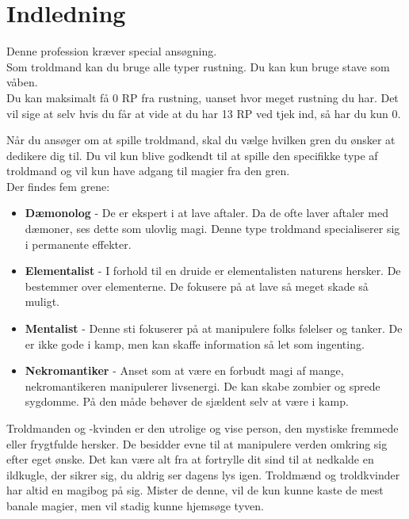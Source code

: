 \chapter{Indledning}

Denne profession kræver special ansøgning.\\
Som troldmand kan du bruge alle typer rustning. Du kan kun bruge stave som våben.\\
Du kan maksimalt få 0 RP fra rustning, uanset hvor meget rustning du har. Det vil sige at selv hvis du får at vide at du har 13 RP ved tjek ind, så har du kun 0.

Når du ansøger om at spille troldmand, skal du vælge hvilken gren du ønsker at dedikere dig til. Du vil kun blive godkendt til at spille den specifikke type af troldmand og vil kun have adgang til magier fra den gren.\\
Der findes fem grene:\\
\begin{itemize}
    \item \textbf{Dæmonolog} - De er ekspert i at lave aftaler. Da de ofte laver aftaler med dæmoner, ses dette som ulovlig magi. Denne type troldmand specialiserer sig i permanente effekter.
    \item \textbf{Elementalist} - I forhold til en druide er elementalisten naturens hersker. De bestemmer over elementerne. De fokusere på at lave så meget skade så muligt.
    \item \textbf{Mentalist} - Denne sti fokuserer på at manipulere folks følelser og tanker. De er ikke gode i kamp, men kan skaffe information så let som ingenting.
    \item \textbf{Nekromantiker} - Anset som at være en forbudt magi af mange, nekromantikeren manipulerer livsenergi. De kan skabe zombier og sprede sygdomme. På den måde behøver de sjældent selv at være i kamp.
\end{itemize}

Troldmanden og -kvinden er den utrolige og vise person, den mystiske fremmede eller frygtfulde
hersker. De besidder evne til at manipulere verden omkring sig efter eget ønske. Det kan være alt fra
at fortrylle dit sind til at nedkalde en ildkugle, der sikrer sig, du aldrig ser dagens lys igen. Troldmænd
og troldkvinder har altid en magibog på sig. Mister de denne, vil de kun kunne kaste de mest banale
magier, men vil stadig kunne hjemsøge tyven.

